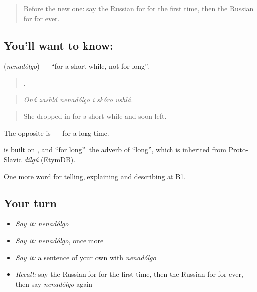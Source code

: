\label{lesson:RU-C278-nenadolgo}



\begin{quote}
Before the new one: say the Russian for for the first time, then the Russian for for ever.
\end{quote}

\subsection*{You'll want to know: }
\textbf{} (\emph{nenadólgo}) — \textquotedblleft{}for a short while, not for long\textquotedblright{}.

\begin{quote}
     .
\end{quote}

\begin{quote}
\emph{Oná zashlá nenadólgo i skóro ushlá.}
\end{quote}

\begin{quote}
She dropped in for a short while and soon left.
\end{quote}

The opposite is \emph{} — for a long time.

\begin{cousinweb}
\emph{} is built on \emph{}, \emph{} and \emph{} \textquotedblleft{}for long\textquotedblright{}, the adverb of \emph{} \textquotedblleft{}long\textquotedblright{}, which is inherited from Proto-Slavic \emph{dĭlgŭ} (EtymDB).
\end{cousinweb}

\begin{grammarlens}[title={What you've built}]
One more word for telling, explaining and describing at B1.
\end{grammarlens}

\subsection*{Your turn}
\begin{itemize}
\raggedright
  \item \emph{Say it:} \emph{nenadólgo}
  \item \emph{Say it:} \emph{nenadólgo}, once more
  \item \emph{Say it:} a sentence of your own with \emph{nenadólgo}
  \item \emph{Recall:} say the Russian for for the first time, then the Russian for for ever, then say \emph{nenadólgo} again
\end{itemize}

